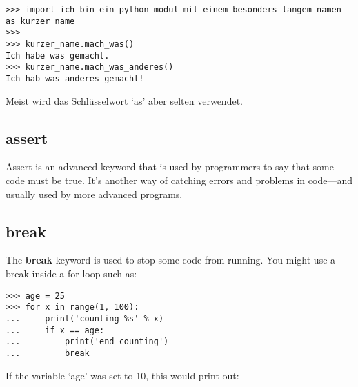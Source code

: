 
\begin{Verbatim}[frame=single]
>>> import ich_bin_ein_python_modul_mit_einem_besonders_langem_namen as kurzer_name
>>>
>>> kurzer_name.mach_was()
Ich habe was gemacht.
>>> kurzer_name.mach_was_anderes()
Ich hab was anderes gemacht!
\end{Verbatim}

\noindent
Meist wird das Schlüsselwort `as' aber selten verwendet.

\subsection*{assert}

Assert is an advanced keyword that is used by programmers to say that some code must be true. It's another way of catching errors and problems in code---and usually used by more advanced programs.

\subsection*{break}

The \textbf{break} keyword is used to stop some code from running. You might use a break inside a for-loop such as:

\begin{Verbatim}[frame=single]
>>> age = 25
>>> for x in range(1, 100):
...     print('counting %s' % x)
...     if x == age:
...         print('end counting')
...         break
\end{Verbatim}

\noindent
If the variable `age' was set to 10, this would print out:

